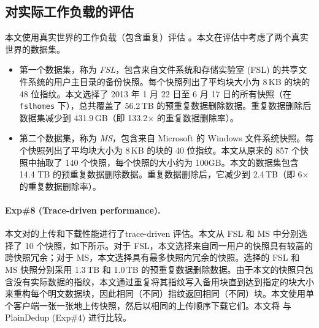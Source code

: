 \subsection{对实际工作负载的评估}
\label{subsec:sgxdedup-real-world}

本文使用真实世界的工作负载（包含重复）评估 \sysnameS。本文在评估中考虑了两个真实世界的数据集。
\begin{itemize}[leftmargin=*]
\item 第一个数据集，称为 \textit{ FSL}，包含来自文件系统和存储实验室 (FSL) \cite{fsl,sun16} 的共享文件系统的用户主目录的备份快照。每个快照列出了平均块大小为 8\,KB 的块的 48 位指纹。本文选择了 2013 年 1 月 22 日至 6 月 17 日的所有快照（在 \texttt{fslhomes} 下），总共覆盖了 56.2\,TB 的预重复数据删除数据。重复数据删除后数据集减少到 431.9\,GB（即 133.2$\times$ 的重复数据删除率）。
\item 第二个数据集，称为 \textit{ MS}，包含来自 Microsoft \cite{meyer11} 的 Windows 文件系统快照。每个快照列出了平均块大小为 8\,KB 的块的 40 位指纹。本文从原来的 857 个快照中抽取了 140 个快照，每个快照的大小约为 100GB。本文的数据集包含 14.4 TB 的预重复数据删除数据。重复数据删除后，它减少到 2.4\,TB（即 6$\times$ 的重复数据删除率）。
\end{itemize}



\paragraph*{Exp\#8 (Trace-driven performance).} 本文对\sysnameS 的上传和下载性能进行了trace-driven 评估。本文从 FSL 和 MS 中分别选择了 10 个快照，如下所示。对于 FSL，本文选择来自同一用户的快照具有较高的跨快照冗余；对于 MS，本文选择具有最多快照内冗余的快照。选择的 FSL 和 MS 快照分别采用 1.3\,TB 和 1.0\,TB 的预重复数据删除数据。由于本文的快照只包含没有实际数据的指纹，本文通过重复将其指纹写入备用块直到达到指定的块大小来重构每个明文数据块，因此相同（不同）指纹返回相同（不同）块。本文使用单个客户端一张一张地上传快照，然后以相同的上传顺序下载它们。本文将 \sysnameS 与 PlainDedup (Exp\#4) 进行比较。

